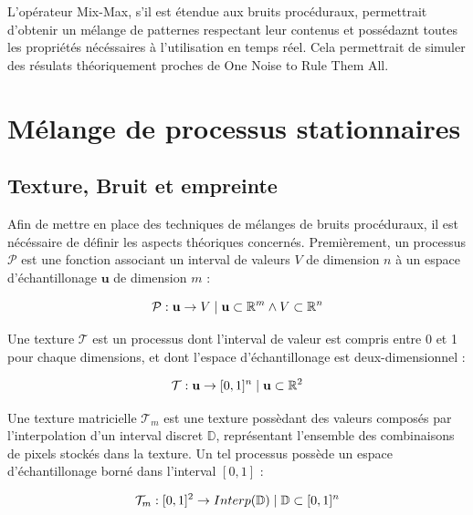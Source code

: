 \documentclass{article}
\begin{document}
L'opérateur Mix-Max, s'il est étendue aux bruits procéduraux, permettrait
d'obtenir un mélange de patternes respectant leur contenus et possédaznt toutes
les propriétés nécéssaires à l'utilisation en temps réel. Cela permettrait de
simuler des résulats théoriquement proches de One Noise to Rule Them All.

\newpage

\section{Mélange de processus stationnaires}

\subsection{Texture, Bruit et empreinte}

Afin de mettre en place des techniques de mélanges de bruits procéduraux, il
est nécéssaire de définir les aspects théoriques concernés. Premièrement, un
processus $\mathcal{P}$ est une fonction associant un interval de valeurs $V$
de dimension $n$ à un espace d'échantillonage $\mathbf{u}$ de dimension $m$ :

\begin{equation}\centering\label{Def processus}
    \mathcal{P} : \mathbf{u} \rightarrow V \mid \mathbf{u} \subset \mathbb{R}^m \land V \subset \mathbb{R}^n
\end{equation}

Une texture $\mathcal{T}$ est un processus dont l'interval de valeur est
compris entre 0 et 1 pour chaque dimensions, et dont l'espace d'échantillonage
est deux-dimensionnel :

\begin{equation}\centering\label{Def Texture}
    \mathcal{T} : \mathbf{u} \rightarrow [0, 1]^n \mid \mathbf{u} \subset \mathbb{R}^2
\end{equation}

Une texture matricielle $\mathcal{T}_m$ est une texture possèdant des valeurs
composés par l'interpolation d'un interval discret $\mathbb{D}$, représentant
l'ensemble des combinaisons de pixels stockés dans la texture. Un tel processus
possède un espace d'échantillonage borné dans l'interval $[0, 1]$ :

\begin{equation}\centering\label{Def Texture Matricielle}
    \mathcal{T}_m : [0, 1]^2 \rightarrow Interp (\mathbb{D}) \mid \mathbb{D} \subset [0, 1]^n
\end{equation}
\end{document}
